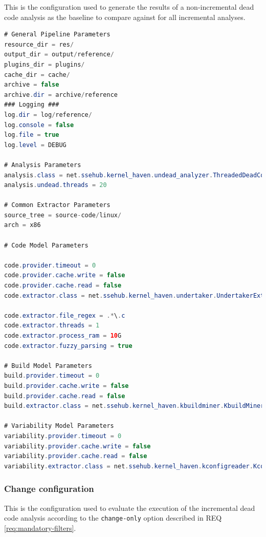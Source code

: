 \documentclass[a4paper]{article}
\begin{document}
This is the configuration used to generate the results of a non-incremental dead code analysis as the baseline to compare against for all incremental analyses.

\begin{lstlisting}[language=java]
# General Pipeline Parameters 
resource_dir = res/
output_dir = output/reference/
plugins_dir = plugins/
cache_dir = cache/
archive = false
archive.dir = archive/reference
### Logging ###
log.dir = log/reference/
log.console = false
log.file = true
log.level = DEBUG

# Analysis Parameters
analysis.class = net.ssehub.kernel_haven.undead_analyzer.ThreadedDeadCodeAnalysis
analysis.undead.threads = 20

# Common Extractor Parameters
source_tree = source-code/linux/
arch = x86

# Code Model Parameters

code.provider.timeout = 0
code.provider.cache.write = false
code.provider.cache.read = false
code.extractor.class = net.ssehub.kernel_haven.undertaker.UndertakerExtractor

code.extractor.file_regex = .*\.c
code.extractor.threads = 1
code.extractor.process_ram = 10G
code.extractor.fuzzy_parsing = true

# Build Model Parameters
build.provider.timeout = 0
build.provider.cache.write = false
build.provider.cache.read = false
build.extractor.class = net.ssehub.kernel_haven.kbuildminer.KbuildMinerExtractor

# Variability Model Parameters
variability.provider.timeout = 0
variability.provider.cache.write = false
variability.provider.cache.read = false
variability.extractor.class = net.ssehub.kernel_haven.kconfigreader.KconfigReaderExtractor
\end{lstlisting}

\subsubsection{Change configuration}

This is the configuration used to evaluate the execution of the incremental dead code analysis according to the \texttt{change-only} option described in  REQ \ref{req:mandatory-filters}.
\end{document}
